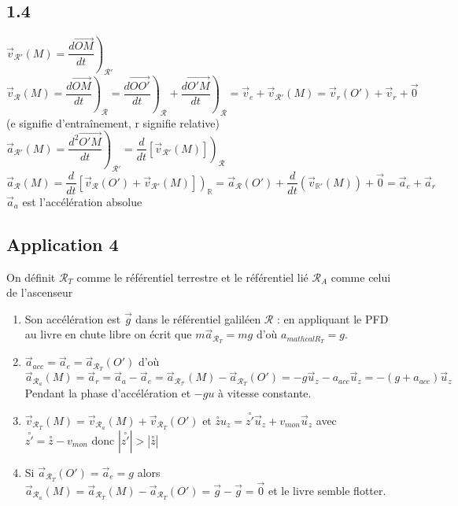 \documentclass[a4paper,12pt]{book}
\begin{document}
\subsection{1.4}
$\vec{v}_{\mathcal{R}'}(M) = \left.\dfrac{d\vec{OM}}{dt}\right)_{\mathcal{R}'}$
\\ $\vec{v}_{\mathcal{R}}(M) = \left.\dfrac{d\vec{OM}}{dt}\right)_{\mathcal{R}} = \left.\dfrac{d\vec{OO'}}{dt}\right)_\mathcal{R} + \left.\dfrac{d\vec{O'M}}{dt}\right)_{\mathcal{R}} = \vec{v}_e + \vec{v}_{\mathcal{R}'}(M) = \vec{v}_r(O') + \vec{v}_r+ \vec{0}$
\\ (e signifie d'entraînement, r signifie relative)
\\ $\vec{a}_{\mathcal{R}'}(M) = \left.\dfrac{d^2\vec{O'M}}{dt}\right)_{\mathcal{R}'} = \left.\dfrac{d}{dt}[\vec{v}_{\mathcal{R}'}(M)]\right)_\mathcal{R}$
\\ $\vec{a}_{\mathcal{R}}(M) = \dfrac{d}{dt} \left.[\vec{v}_\mathcal{R}(O') + \vec{v}_{\mathcal{R}'}(M)]\right)_\mathbb{R} = \vec{a}_\mathcal{R}(O') + \dfrac{d}{dt}(\vec{v}_{\mathbb{R}'}(M)) +\vec{0}  = \vec{a}_e + \vec{a}_r$
\\ $\vec{a}_a$ est l'accélération absolue 

\subsection{Application 4}
On définit $\mathcal{R}_T$ comme le référentiel terrestre et le référentiel lié $\mathcal{R}_A$ comme celui de l'ascenseur
\begin{enumerate}
\item Son accélération est $\vec{g}$ dans le référentiel galiléen $\mathcal{R}$ : en appliquant le PFD au livre en chute libre on écrit que $m\vec{a}_{\mathcal{R}_T} =mg$ d'où $a_{mathcal{R}_T}=g$.
\item $\vec{a}_{acc} = \vec{a}_e = \vec{a}_{\mathcal{R}_T}(O')$ d'où $\vec{a}_{\mathcal{R}_a}(M) = \vec{a}_r = \vec{a}_a - \vec{a}_e = \vec{a}_{\mathcal{R_T}}(M) - \vec{a}_{\mathcal{R}_T}(O') = -g\vec{u}_z - a_{acc}\vec{u}_z = -(g+a_{acc})\vec{u}_z$ Pendant la phase d'accélération et $-gu$ à vitesse constante.
\item $\vec{v}_{\mathcal{R}_T}(M) = \vec{v}_{\mathcal{R}_a}(M) + \vec{v}_{\mathcal{R}_T} (O')$ et $\overset{\circ}{z}u_z = \overset{\circ}{z'}\vec{u}_z + v_{mon}\vec{u}_z$ avec $\overset{\circ}{z'} = \overset{\circ}{z} - v_{mon}$ donc $|\overset{\circ}{z'}|>|\overset{\circ}{z}|$
\item Si $\vec{a}_{\mathcal{R}_T}(O') = \vec{a}_e = g$ alors $\vec{a}_{\mathcal{R}_a}(M) = \vec{a}_{\mathcal{R}_T}(M) - \vec{a}_{\mathcal{R}_T}(O') = \vec{g} - \vec{g} = \vec{0}$ et le livre semble flotter.
\end{enumerate}
\end{document}
